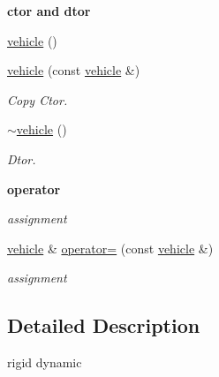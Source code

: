 \begin{Indent}{\bf ctor and dtor}\par
{\em \label{_amgrp98fbd3e5ae66fcd014fb744fec76c58d}
 }\begin{DoxyCompactItemize}
\item 
\hyperlink{classnebula_1_1content_1_1actor_1_1physics_1_1vehicle_aaceeb5f53c1dcb1199e1564e2132748b}{vehicle} ()
\item 
\hyperlink{classnebula_1_1content_1_1actor_1_1physics_1_1vehicle_a756405424b4357fa43c473213b7afe04}{vehicle} (const \hyperlink{classnebula_1_1content_1_1actor_1_1physics_1_1vehicle}{vehicle} \&)
\begin{DoxyCompactList}\small\item\em Copy Ctor. \item\end{DoxyCompactList}\item 
\hyperlink{classnebula_1_1content_1_1actor_1_1physics_1_1vehicle_aaea3f60e22369bf24ebc74746397bf0b}{$\sim$vehicle} ()
\begin{DoxyCompactList}\small\item\em Dtor. \item\end{DoxyCompactList}\end{DoxyCompactItemize}
\end{Indent}
\begin{Indent}{\bf operator}\par
{\em \label{_amgrp4b583376b2767b923c3e1da60d10de59}
 assignment }\begin{DoxyCompactItemize}
\item 
\hyperlink{classnebula_1_1content_1_1actor_1_1physics_1_1vehicle}{vehicle} \& \hyperlink{classnebula_1_1content_1_1actor_1_1physics_1_1vehicle_a3f3cc0f6995d59a681f8a70a2969f148}{operator=} (const \hyperlink{classnebula_1_1content_1_1actor_1_1physics_1_1vehicle}{vehicle} \&)
\begin{DoxyCompactList}\small\item\em assignment \item\end{DoxyCompactList}\end{DoxyCompactItemize}
\end{Indent}


\subsection{Detailed Description}
rigid dynamic 


